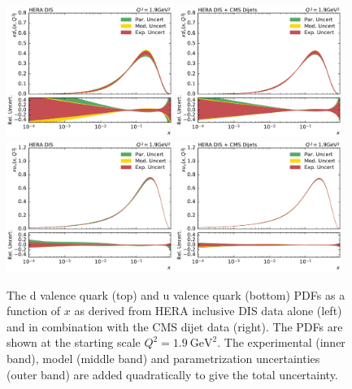 \begin{figure}[tbp]
  \centering
  \includegraphics[width=0.48\textwidth]{figures/pdf_constraints/pdfcomp_HFTD_HERA_7_1.9.pdf}\hfill%
  \includegraphics[width=0.48\textwidth]{figures/pdf_constraints/pdfcomp_HFTD_HERACMSTDJETS_7_1.9.pdf}
  \includegraphics[width=0.48\textwidth]{figures/pdf_constraints/pdfcomp_HFTD_HERA_8_1.9.pdf}\hfill%
  \includegraphics[width=0.48\textwidth]{figures/pdf_constraints/pdfcomp_HFTD_HERACMSTDJETS_8_1.9.pdf}

  \caption[The d valence and u valence quark PDFs]{The d valence quark (top) and u
    valence quark (bottom) PDFs as a function of $x$ as
  derived from HERA inclusive DIS data alone (left) and in combination with
  the CMS dijet data (right). The PDFs are shown at the starting scale $Q^2 =
  \SI{1.9}{\GeV \squared}$. The experimental (inner band), model (middle band)
  and parametrization uncertainties (outer band) are added quadratically to give
  the total uncertainty.}
  \label{fig:pdfconstraints:split:dvaluval:19}
\end{figure}

